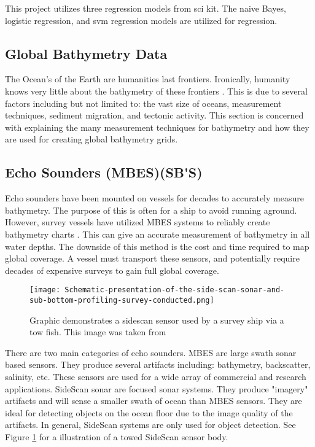 
This project utilizes three regression models from sci kit.
The naive Bayes\cite{sklearn_api}, logistic regression\cite{sklearn_api}, and svm regression\cite{sklearn_api} models are utilized for regression.

\subsection{Global Bathymetry Data}
The Ocean's of the Earth are humanities last frontiers.
Ironically, humanity knows very little about the bathymetry of these frontiers \cite{becker2009global}.
This is due to several factors including but not limited to: the vast size of oceans, measurement techniques, sediment migration, and tectonic activity.
This section is concerned with explaining the many measurement techniques for bathymetry and how they are used for creating global bathymetry grids.

\subsection{Echo Sounders (\ac{MBES})(\ac{SB'S}) }
Echo sounders have been mounted on vessels for decades to accurately measure bathymetry.
The purpose of this is often for a ship to avoid running aground.
However, survey vessels have utilized \ac{MBES} systems to reliably create bathymetry charts \cite{farr1980multibeam}.
This can give an accurate measurement of bathymetry in all water depths.
The downside of this method is the cost and time required to map global coverage.
A vessel must transport these sensors, and potentially require decades of expensive surveys to gain full global coverage.

\begin{figure}[h]
    \centering
    \texttt{[image: Schematic-presentation-of-the-side-scan-sonar-and-sub-bottom-profiling-survey-conducted.png]}
    \caption{Graphic demonstrates a sidescan sensor used by a survey ship via a tow fish.
    This image was taken from \cite{sakellariou2015preliminary}}
    \label{fig:sidescandemo}
\end{figure}


There are two main categories of echo sounders.
\ac{MBES} are large swath sonar based sensors.
They produce several artifacts including: bathymetry, backscatter, salinity, etc.
These sensors are used for a wide array of commercial and research applications.
SideScan sonar are focused sonar systems.
They produce "imagery" artifacts and will sense a smaller swath of ocean than \ac{MBES} sensors.
They are ideal for detecting objects on the ocean floor due to the image quality of the artifacts.
In general, SideScan systems are only used for object detection.
See Figure \ref{fig:sidescandemo} for a illustration of a towed SideScan sensor body.


